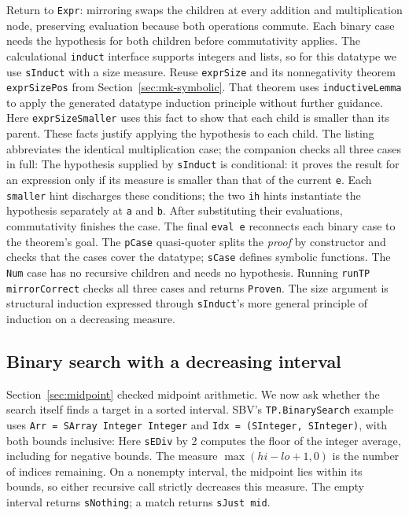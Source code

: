 \documentclass[review]{jfp-epi}
\newcommand{\code}[1]{\texttt{#1}}
\begin{document}
Return to \code{Expr}: mirroring swaps the children at every addition and
multiplication node, preserving evaluation because both operations commute.
Each binary case needs the hypothesis for both children before commutativity applies.
The calculational \code{induct} interface supports integers and lists, so for
this datatype we use \code{sInduct} with a size measure.
Reuse \code{exprSize} and its nonnegativity theorem \code{exprSizePos} from
Section~\ref{sec:mk-symbolic}. That theorem uses \code{inductiveLemma} to apply
the generated datatype induction principle without further guidance. Here
\code{exprSizeSmaller} uses this fact to show that each child is smaller than
its parent. These facts justify applying the hypothesis to each child.
The listing abbreviates the identical multiplication case; the companion
checks all three cases in full:
The hypothesis supplied by \code{sInduct} is conditional: it proves the result
for an expression only if its measure is smaller than that of the current
\code{e}. Each \code{smaller} hint discharges these conditions; the two
\code{ih} hints instantiate the hypothesis separately at \code{a} and \code{b}.
After substituting their evaluations, commutativity finishes the case.
The final \code{eval e} reconnects each binary case to the theorem's goal.
The \code{pCase} quasi-quoter splits the \emph{proof} by constructor and checks
that the cases cover the datatype; \code{sCase} defines symbolic functions.
The \code{Num} case has no recursive children and needs no hypothesis.
Running \code{runTP mirrorCorrect} checks all three cases and returns
\code{Proven}. The size argument is structural induction expressed through
\code{sInduct}'s more general principle of induction on a decreasing measure.

\subsection{Binary search with a decreasing interval}
\label{sec:binary-search}

Section~\ref{sec:midpoint} checked midpoint arithmetic. We now ask whether the
search itself finds a target in a sorted interval. SBV's
\code{TP.BinarySearch} example uses \code{Arr = SArray Integer Integer} and
\code{Idx = (SInteger, SInteger)}, with both bounds inclusive:
Here \code{sEDiv} by 2 computes the floor of the integer average, including for
negative bounds. The measure $\max(\mathit{hi}-\mathit{lo}+1,0)$ is the number
of indices remaining. On a nonempty interval, the midpoint lies within its
bounds, so either recursive call strictly decreases this measure. The empty
interval returns \code{sNothing}; a match returns \code{sJust mid}.
\end{document}
